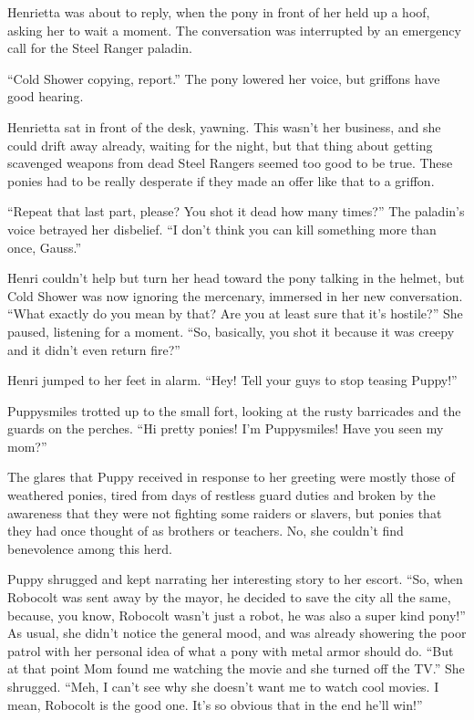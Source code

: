 Henrietta was about to reply, when the pony in front of her held up a hoof, asking her to wait a moment. The conversation was interrupted by an emergency call for the Steel Ranger paladin.

``Cold Shower copying, report.'' The pony lowered her voice, but griffons have good hearing.

Henrietta sat in front of the desk, yawning. This wasn't her business, and she could drift away already, waiting for the night, but that thing about getting scavenged weapons from dead Steel Rangers seemed too good to be true. These ponies had to be really desperate if they made an offer like that to a griffon.

``Repeat that last part, please? You shot it dead how many times?'' The paladin's voice betrayed her disbelief. ``I don't think you can kill something more than once, Gauss.''

Henri couldn't help but turn her head toward the pony talking in the helmet, but Cold Shower was now ignoring the mercenary, immersed in her new conversation. ``What exactly do you mean by that? Are you at least sure that it's hostile?'' She paused, listening for a moment. ``So, basically, you shot it because it was creepy and it didn't even return fire?''

Henri jumped to her feet in alarm. ``Hey! Tell your guys to stop teasing Puppy!''



\horizonline


Puppysmiles trotted up to the small fort, looking at the rusty barricades and the guards on the perches. ``Hi pretty ponies! I'm Puppysmiles! Have you seen my mom?''

The glares that Puppy received in response to her greeting were mostly those of weathered ponies, tired from days of restless guard duties and broken by the awareness that they were not fighting some raiders or slavers, but ponies that they had once thought of as brothers or teachers. No, she couldn't find benevolence among this herd.

Puppy shrugged and kept narrating her interesting story to her escort. ``So, when Robocolt was sent away by the mayor, he decided to save the city all the same, because, you know, Robocolt wasn't just a robot, he was also a super kind pony!'' As usual, she didn't notice the general mood, and was already showering the poor patrol with her personal idea of what a pony with metal armor should do. ``But at that point Mom found me watching the movie and she turned off the TV.'' She shrugged. ``Meh, I can't see why she doesn't want me to watch cool movies. I mean, Robocolt is the good one. It's so obvious that in the end he'll win!''

